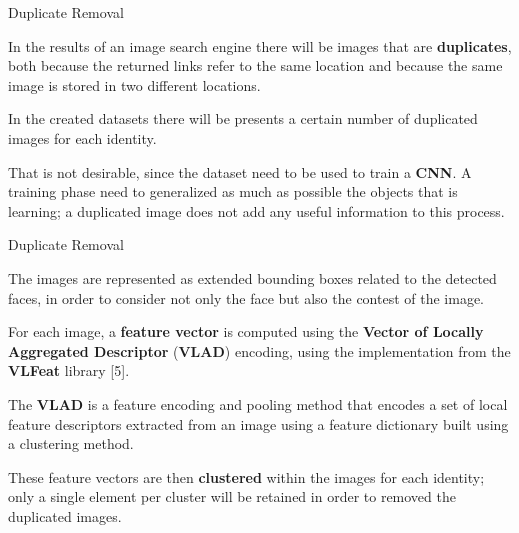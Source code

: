 \begin{tframe}{Duplicate Removal}

In the results of an image search engine there will be images that are \textbf{duplicates}, both because the returned links refer to the same location and because the same image is stored in two different locations. 

\vspace{0.1in}

In the created datasets there will be presents a certain number of duplicated images for each identity. 

\vspace{0.1in}

That is not desirable, since the dataset need to be used to train a \textbf{CNN}. A training phase need to generalized as much as possible the objects that is learning; a duplicated image does not add any useful information to this process.


\end{tframe}


\begin{tframe}{Duplicate Removal}

The images are represented as extended bounding boxes related to the detected faces, in order to consider not only the face but also the contest of the image.

\vspace{0.1in}

For each image, a \textbf{feature vector} is computed using the \textbf{Vector of Locally Aggregated Descriptor} (\textbf{VLAD}) encoding, using the implementation from the \textbf{VLFeat} library [5]. 

\vspace{0.1in}

The \textbf{VLAD} is a feature encoding and pooling method that encodes a set of local feature descriptors extracted from an image using a feature dictionary built using a clustering method. 

\vspace{0.1in}

These feature vectors are then \textbf{clustered} within the images for each identity; only a single element per cluster will be retained in order to removed the duplicated images.

\end{tframe}


